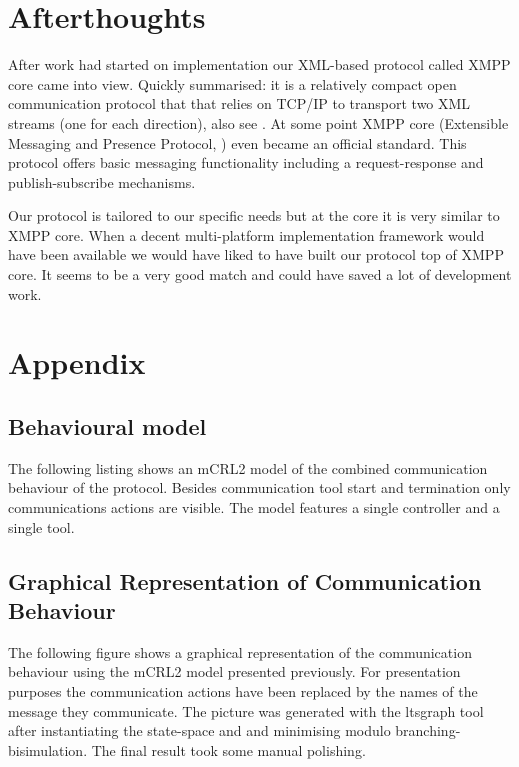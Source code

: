 \documentclass{article}
\begin{document}
  \section{Afterthoughts}

   After work had started on implementation our XML-based protocol called
   XMPP core came into view.  Quickly summarised: it is a relatively compact open
   communication protocol that that relies on TCP/IP to transport two XML
   streams (one for each direction), also see \cite{Sperberg-McQueen:06:EML}.
   At some point XMPP core (Extensible Messaging and Presence Protocol,
   \cite{rfc3920}) even became an official standard. This protocol offers basic
   messaging functionality including a request-response and publish-subscribe
   mechanisms.
   
   Our protocol is tailored to our specific needs but at the core it is very
   similar to XMPP core. When a decent multi-platform implementation framework
   would have been available we would have liked to have built our protocol top
   of XMPP core. It seems to be a very good match and could have saved a lot of
   development work.

  \enlargethispage*{4pt}
  

  \appendix
  \section{Appendix}
  \pagestyle{empty}

  \subsection{Behavioural model}
   The following listing shows an mCRL2 model of the combined communication
   behaviour of the protocol. Besides communication tool start and termination
   only communications actions are visible. The model features a single
   controller and a single tool.

  \small  \normalsize

  \pagebreak

  \subsection{Graphical Representation of Communication Behaviour}

   The following figure shows a graphical representation of the communication
   behaviour using the mCRL2 model presented previously. For presentation
   purposes the communication actions have been replaced by the names of the
   message they communicate.  The picture was generated with the ltsgraph tool
   after instantiating the state-space and and minimising modulo
   branching-bisimulation. The final result took some manual polishing.
\end{document}
